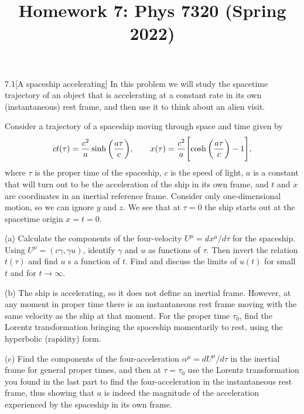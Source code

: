 \documentclass[12pt]{article}
\title{Homework 7: Phys 7320 (Spring 2022)}
\begin{document}
\maketitle
\begin{problem}{7.1}[A spaceship accelerating]
In this problem we will study the spacetime trajectory of an object that is
accelerating at a constant rate in its own (instantaneous) rest frame, and then
use it to think about an alien visit.

Consider a trajectory of a spaceship moving through space and time given by
\begin{equation}
    ct(\tau)=\frac{c^2}{a}\sinh\qty(\frac{a\tau}{c}),\qquad
    x(\tau)=\frac{c^2}{a}\qty[\cosh\qty(\frac{a\tau}{c})-1],
\end{equation}
where $\tau$ is the proper time of the spaceship, $c$ is the speed of light, $a$
is a constant that will turn out to be the acceleration of the ship in its own
frame, and $t$ and $x$ are coordinates in an inertial reference frame. Consider
only one-dimensional motion, so we can ignore $y$ and $z$. We see that at
$\tau=0$ the ship starts out at the spacetime origin $x=t=0$.

(a) Calculate the components of the four-velocity $U^\mu=dx^\mu/d\tau$ for the
spaceship. Using $U^\mu=(c\gamma,\gamma u)$, identify $\gamma$ and $u$ as
functions of $\tau$. Then invert the relation $t(\tau)$ and find $u$ s a
function of $t$. Find and discuss the limits of $u(t)$ for small $t$ and for
$t\to\infty$.

(b) The ship is accelerating, so it does not define an inertial frame. However,
at any moment in proper time there is an instantaneous rest frame moving with
the same velocity as the ship at that moment. For the proper time $\tau_0$, find
the Lorentz transformation bringing the spaceship momentarily to rest, using the
hyperbolic (rapidity) form.

(c) Find the components of the four-acceleration $\alpha^\mu=dU^\mu/d\tau$ in
the inertial frame for general proper times, and then at $\tau=\tau_0$ use the
Lorentz transformation you found in the last part to find the four-acceleration
in the instantaneous rest frame, thus showing that $a$ is indeed the magnitude
of the acceleration experienced by the spaceship in its own frame.


\end{problem}
\end{document}
